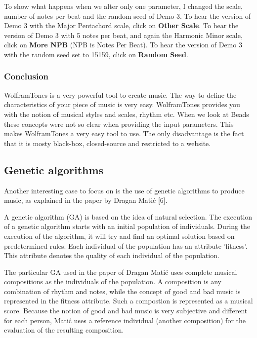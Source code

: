 \documentclass[12pt]{article}
\begin{document}
To show what happens when we alter only one parameter, I changed the scale, number of notes per beat and the random seed of Demo 3. To hear the version of Demo 3 with the Major Pentachord scale, click on \textbf{Other Scale}. To hear the version of Demo 3 with 5 notes per beat, and again the Harmonic Minor scale, click on \textbf{More NPB} (NPB is Notes Per Beat). To hear the version of Demo 3 with the random seed set to 15159, click on \textbf{Random Seed}.

\subsubsection{Conclusion}

WolframTones is a very powerful tool to create music. The way to define the characteristics of your piece of music is very easy. WolframTones provides you with the notion of musical styles and scales, rhythm etc. When we look at Beads these concepts were not so clear when providing the input parameters. This makes WolframTones a very easy tool to use. The only disadvantage is the fact that it is mosty black-box, closed-source and restricted to a website.

\subsection{Genetic algorithms}

Another interesting case to focus on is the use of genetic algorithms to produce music, as explained in the paper by Dragan Mati\'c [6].
\newline

A genetic algorithm (GA) is based on the idea of natural selection. The execution of a genetic algorithm starts with an initial population of individuals. During the execution of the algorithm, it will try and find an optimal solution based on predetermined rules. Each individual of the population has an attribute 'fitness'. This attribute denotes the quality of each individual of the population.
\newline

The particular GA used in the paper of Dragan Mati\'c uses complete musical compositions as the individuals of the population. A composition is any combination of rhythm and notes, while the concept of good and bad music is represented in the fitness attribute. Such a compostion is represented as a musical score. Because the notion of good and bad music is very subjective and different for each person, Mati\'c uses a reference individual (another composition) for the evaluation of the resulting composition.
\newline
\end{document}
